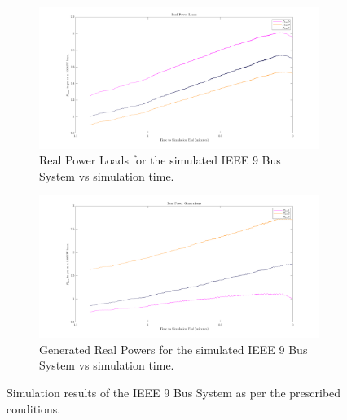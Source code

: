 \begin{figure}[!ht]
	\label{fig:psse_run02}
	\centering
	\begin{subfigure}{\textwidth}
		\centering
		\includegraphics[scale=0.25]{../figures/analysis_matlab/ploads_run02}
		\caption{Real Power Loads for the simulated IEEE 9 Bus System vs simulation time.}
	\end{subfigure}
	
	\begin{subfigure}{\textwidth}
		\centering
		\includegraphics[scale=0.25]{../figures/analysis_matlab/pgens_run02}
		\caption{Generated Real Powers for the simulated IEEE 9 Bus System vs simulation time.}
	\end{subfigure}

	\caption{Simulation results of the IEEE 9 Bus System as per the prescribed conditions.}
\end{figure}

